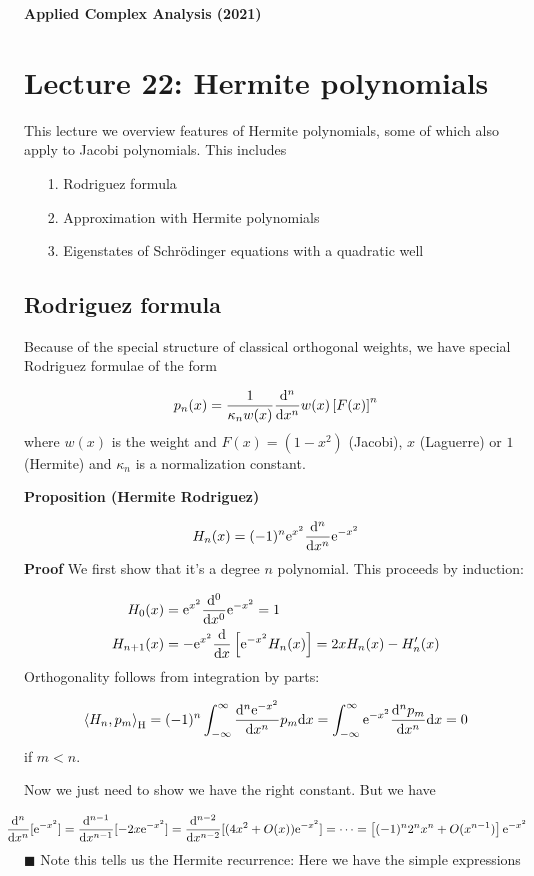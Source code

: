 \documentclass[12pt,landscape]{article}
\def\D{ {\rm d} }
\def\E{ {\rm e} }
\def\ip<#1>{\left\langle{#1}\right\rangle}
\def\dx{\D x}
\begin{document}
{\LARGE
\sf
\textbf{Applied Complex Analysis (2021)}

\section{Lecture 22: Hermite polynomials}
This lecture we overview features of Hermite polynomials, some of which also apply to Jacobi polynomials.  This includes

\begin{itemize}
\item[1. ] Rodriguez formula


\item[2. ] Approximation with Hermite polynomials


\item[3. ] Eigenstates of Schrödinger equations with a quadratic well

\end{itemize}
\newpage
\subsection{Rodriguez formula}
Because of the special structure of classical orthogonal weights, we have special Rodriguez formulae of the form

\[
 p_n(x) = {1 \over \kappa_n w(x)} {\D^n \over \dx^n} w(x) \left[F(x)\right]^n
\]
where $w(x)$ is the weight and $F(x) = (1-x^2)$ (Jacobi), $x$ (Laguerre) or $1$ (Hermite) and $\kappa_n$ is a normalization constant.

\textbf{Proposition (Hermite Rodriguez)}

\[
H_n(x)= (-1)^n \E^{x^2}  {\D^n \over \dx^n} \E^{-x^2}
\]
\newpage
\textbf{Proof} We first show that it's a degree $n$ polynomial. This proceeds by induction:


\begin{align*}
 H_0(x) &= \E^{x^2} {\D^0 \over \dx^0}\E^{-x^2} = 1 \\
 H_{n+1}(x) &= -\E^{x^2}{\D \over \dx}\left[\E^{-x^2} H_{n}(x)\right] =   2x H_{n}(x) - H_n'(x)
\end{align*}
Orthogonality follows from integration by parts:

\[
\ip<H_n, p_m>_{\rm H} = (-1)^n \int_{-\infty}^{\infty}  {\D^n  \E^{-x^2} \over \dx^n} p_m \dx = \int_{-\infty}^{\infty}  \E^{-x^2} {\D^n p_m \over \dx^n} \dx = 0
\]
if $m < n$.

Now we just need to show we have the right constant. But we have

\[
\hspace*{-0.5cm} {\D^n \over \dx^n}[\E^{-x^2}] =  {\D^{n-1} \over \dx^{n-1}}[-2x \E^{-x^2}] = {\D^{n-2} \over \dx^{n-2}}[(4x^2 + O(x)) \E^{-x^2}] = \cdots = \left[(-1)^n 2^n x^n + O(x^{n-1})\right]\E^{-x^2}
\]
\ensuremath{\blacksquare}
\newpage
Note this tells us the Hermite recurrence: Here we have the simple expressions

}
\end{document}
